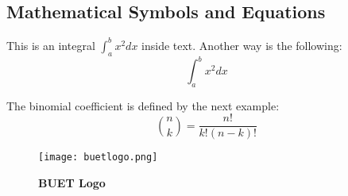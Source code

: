 \documentclass{article}
\begin{document}
\begin{twocolumn}
\section{Mathematical Symbols and Equations} \label{sec4}
This is an integral $\int_a^b x^2dx$ inside text. Another way is the following:
\begin{displaymath}
  \int_a^b x^2dx
\end{displaymath}

\noindent
The binomial coefficient is defined by the next example:
\begin{equation}
  \binom{n}{k} = \frac{n!}{k!(n-k)!}
\end{equation}

\end{twocolumn}

\begin{onecolumn}

\begin{figure}[h]
  \centering
  \texttt{[image: buetlogo.png]}
  \caption{\textbf{BUET Logo}}
  \label{fig1}
\end{figure}



\end{onecolumn}
\end{document}
